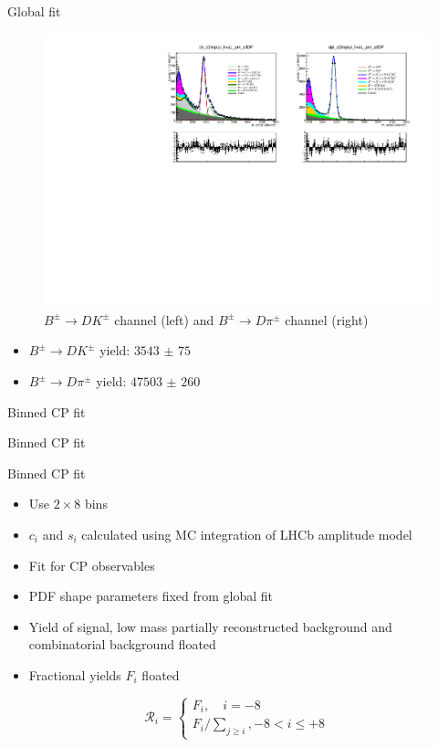 \documentclass{beamer}
\begin{document}
\begin{frame}{Global fit}
  \begin{figure}
    \centering
    \includegraphics[width = 1.0\textwidth]{Plots/d2kkpipi_fiveL_allDP.pdf}
    \caption{$B^\pm\to DK^\pm$ channel (left) and $B^\pm\to D\pi^\pm$ channel (right)}
  \end{figure}
  \vspace{-0.5cm}
  \begin{itemize}
    \item{$B^\pm\to DK^\pm$ yield: $\SI{3543(75)}{}$}
    \item{$B^\pm\to D\pi^\pm$ yield: $\SI{47503(260)}{}$}
  \end{itemize}
\end{frame}

\begin{frame}{Binned CP fit}
  \begin{center}
    {\huge Binned CP fit}
  \end{center}
\end{frame}

\begin{frame}{Binned CP fit}
  \begin{itemize}
    \setlength\itemsep{1.2em}
    \item{Use $2\times 8$ bins}
    \item{$c_i$ and $s_i$ calculated using MC integration of LHCb amplitude model}
    \item{Fit for CP observables}
    \item{PDF shape parameters fixed from global fit}
    \item{Yield of signal, low mass partially reconstructed background and combinatorial background floated}
    \item{Fractional yields $F_i$ floated}
  \end{itemize}
  \begin{equation*}
    \mathcal{R}_i = 
    \begin{cases}
      F_i, \quad i = -8 \\
      F_i/\sum_{j\geq i}, -8 < i\leq+8
    \end{cases}
  \end{equation*}
\end{frame}
\end{document}
